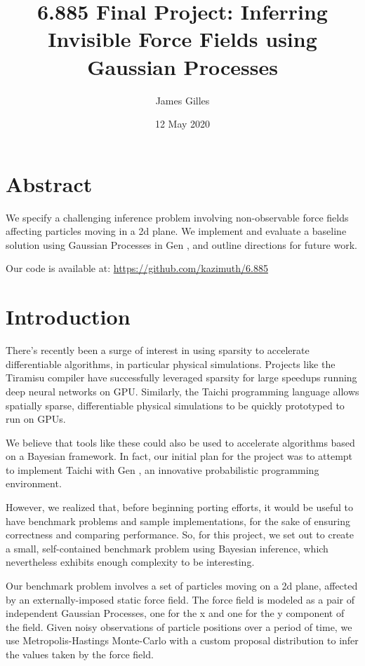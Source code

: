 \documentclass[11pt]{article}
\author{James Gilles}
\date{12 May 2020}
\title{6.885 Final Project: Inferring Invisible Force Fields using Gaussian Processes}
\renewcommand*{\tableofcontents}[0]{}
\begin{document}
\maketitle
\tableofcontents


\section{Abstract}
\label{sec:org6ae6ec4}
We specify a challenging inference problem involving non-observable force fields affecting particles moving in a 2d plane. We implement and evaluate a baseline solution using Gaussian Processes in Gen \citep{GenPaper}, and outline directions for future work.

Our code is available at: \url{https://github.com/kazimuth/6.885}

\section{Introduction}
\label{sec:orge13e976}
There's recently been a surge of interest in using sparsity to accelerate differentiable algorithms, in particular physical simulations. Projects like the Tiramisu compiler \citep{Tiramisu} have successfully leveraged sparsity for large speedups running deep neural networks on GPU. Similarly, the Taichi programming language \citep{Taichi} allows spatially sparse, differentiable physical simulations to be quickly prototyped to run on GPUs.

We believe that tools like these could also be used to accelerate algorithms based on a Bayesian framework. In fact, our initial plan for the project was to attempt to implement Taichi with Gen \citep{GenPaper}, an innovative probabilistic programming environment.

However, we realized that, before beginning porting efforts, it would be useful to have benchmark problems and sample implementations, for the sake of ensuring correctness and comparing performance. So, for this project, we set out to create a small, self-contained benchmark problem using Bayesian inference, which nevertheless exhibits enough complexity to be interesting.

Our benchmark problem involves a set of particles moving on a 2d plane, affected by an externally-imposed static force field. The force field is modeled as a pair of independent Gaussian Processes, one for the x and one for the y component of the field. Given noisy observations of particle positions over a period of time, we use Metropolis-Hastings Monte-Carlo with a custom proposal distribution to infer the values taken by the force field.
\end{document}
